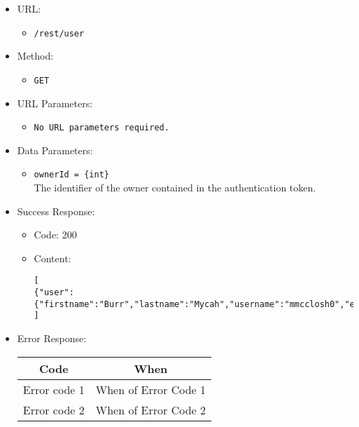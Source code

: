 \begin{itemize}

    \item URL: 
    \begin{itemize}
        \item \texttt{/rest/user}
    \end{itemize}
    
    \item Method: 
    \begin{itemize}
        \item \texttt{GET}
    \end{itemize}
    
    \item URL Parameters: 
    \begin{itemize}
        \item \texttt{No URL parameters required.}
    \end{itemize}
    
    \item Data Parameters: 
    \begin{itemize}
        \item \texttt{ownerId = \{int\}} \\
        The identifier of the owner contained in the authentication token.
    \end{itemize}
    
    \item Success Response: 
    \begin{itemize}
        \item Code: 200
        \item Content: 
        \begin{lstlisting}
[
{"user":{"firstname":"Burr","lastname":"Mycah","username":"mmcclosh0","email":"mchaudret0@dailymail.co.uk","telegram_chat_id":null}},
]
        \end{lstlisting}    
    \end{itemize}
    
    \item Error Response:
    \begin{table}[!h]
    \centering 
    \begin{tabular}{|c|c|}
    \hline
    \multicolumn{1}{|c|}{\textbf{Code}} & \multicolumn{1}{c|}{\textbf{When}} \\ \hline
    Error code 1 & When of Error Code 1 \\\hline
    Error code 2 & When of Error Code 2 \\\hline
    \end{tabular} 
    \end{table} 

\end{itemize}



